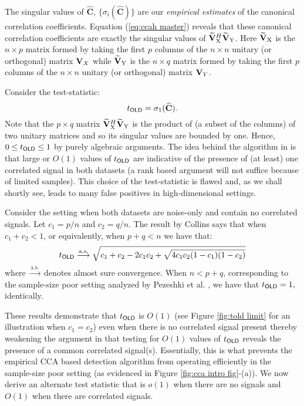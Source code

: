 \documentclass[conference]{IEEEtran}
\newcommand{\Vxt}{\widetilde{{\mathbf{V}}}_{{\rm X}}}
\newcommand{\Vyt}{\widetilde{{\mathbf{V}}}_{{\rm Y}}}
\newcommand{\convas}{\overset{\textrm{a.s.}}{\longrightarrow}}
\newcommand{\CCh}{\widehat{\mathbf{C}}}
\begin{document}
The singular values of $\CCh$, $\{ \sigma_{i}(\CCh)\}$ are our \textit{empirical estimates} of the canonical correlation coefficients. Equation (\ref{eq:ccah master}) reveals that these canonical correlation coefficients are exactly the singular values of  $\Vxt^{H} \Vyt$. Here $\Vxt$ is the $n \times p$ matrix formed by taking the first $p$ columns of the $n \times n$ unitary (or orthogonal) matrix ${\bf V}_{X}$ while $\Vyt$ is the $n \times q$ matrix formed by taking the first $p$ columns of the $n \times n$ unitary (or orthogonal) matrix ${\bf V}_{Y}$.

Consider the test-statistic:
\begin{equation}\label{eq:told}
t_{{\sf OLD}} =  \sigma_{1} (\CCh).
\end{equation}
Note that the $p \times q$ matrix  $\Vxt^{H} \Vyt$ is the product of (a subset of the columns) of two unitary matrices and so its singular values are bounded by one. Hence, $0 \leq t_{{\sf OLD}} \leq 1$ by purely algebraic arguments. The idea behind the algorithm in \cite{gunderson1997estimating} is that large or $O(1)$ values of $t_{{\sf OLD}}$ are indicative of the presence of  (at least) one correlated signal in both datasets (a rank based argument will not suffice because of limited samples). This choice of the test-statistic is flawed and, as we shall shortly see, leads to many false positives in high-dimensional settings.

Consider the setting when both datasets are noise-only and contain no correlated signals. Let $c_1 = p/n$ and $c_2 = q/n$.  The result by Collins \cite{collins2005product} says that when $c_1 + c_2 < 1$, or equivalently, when $p + q < n$ we have that:
$$t_{{\sf OLD}} \convas \sqrt{c_1 + c_2 - 2 c_1 c_2 + \sqrt{4 c_1 c_2 (1-c_1)(1-c_2)}}$$
where $\convas$ denotes almost sure convergence. When $n < p + q$, corresponding to the sample-size poor setting analyzed by Pezeshki et al. \cite{pezeshki2005empirical}, we have that $t_{{\sf OLD}} = 1,$ identically.

These results demonstrate that $t_{{\sf OLD}}$ is $O(1)$ (see Figure \ref{fig:told limit} for an illustration when $c_1 = c_2$) even when there is no correlated signal present thereby weakening the argument in  \cite{gunderson1997estimating} that testing for $O(1)$ values of $t_{{\sf OLD}}$ reveals the presence of a common correlated signal(s). Essentially, this is what prevents the empirical CCA based detection algorithm from operating efficiently in the sample-size poor setting (as evidenced in Figure \ref{fig:cca intro fig}-(a)). We now derive an alternate test statistic that is $o(1)$ when there are no signals and $O(1)$ when there are correlated signals.
\end{document}
